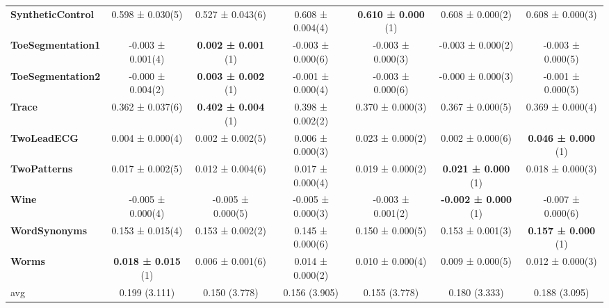\begin{table}[ht]
\begin{adjustbox}{width=\textwidth}
\begin{tabular}{lcccccc}
\textbf{SyntheticControl} & 0.598 ± 0.030(5) & 0.527 ± 0.043(6) & 0.608 ± 0.004(4) & \textbf{0.610 ± 0.000} (1) & 0.608 ± 0.000(2) & 0.608 ± 0.000(3) \\
\textbf{ToeSegmentation1} & -0.003 ± 0.001(4) & \textbf{0.002 ± 0.001} (1) & -0.003 ± 0.000(6) & -0.003 ± 0.000(3) & -0.003 ± 0.000(2) & -0.003 ± 0.000(5) \\
\textbf{ToeSegmentation2} & -0.000 ± 0.004(2) & \textbf{0.003 ± 0.002} (1) & -0.001 ± 0.000(4) & -0.003 ± 0.000(6) & -0.000 ± 0.000(3) & -0.001 ± 0.000(5) \\
\textbf{Trace} & 0.362 ± 0.037(6) & \textbf{0.402 ± 0.004} (1) & 0.398 ± 0.002(2) & 0.370 ± 0.000(3) & 0.367 ± 0.000(5) & 0.369 ± 0.000(4) \\
\textbf{TwoLeadECG} & 0.004 ± 0.000(4) & 0.002 ± 0.002(5) & 0.006 ± 0.000(3) & 0.023 ± 0.000(2) & 0.002 ± 0.000(6) & \textbf{0.046 ± 0.000} (1) \\
\textbf{TwoPatterns} & 0.017 ± 0.002(5) & 0.012 ± 0.004(6) & 0.017 ± 0.000(4) & 0.019 ± 0.000(2) & \textbf{0.021 ± 0.000} (1) & 0.018 ± 0.000(3) \\
\textbf{Wine} & -0.005 ± 0.000(4) & -0.005 ± 0.000(5) & -0.005 ± 0.000(3) & -0.003 ± 0.001(2) & \textbf{-0.002 ± 0.000} (1) & -0.007 ± 0.000(6) \\
\textbf{WordSynonyms} & 0.153 ± 0.015(4) & 0.153 ± 0.002(2) & 0.145 ± 0.000(6) & 0.150 ± 0.000(5) & 0.153 ± 0.001(3) & \textbf{0.157 ± 0.000} (1) \\
\textbf{Worms} & \textbf{0.018 ± 0.015} (1) & 0.006 ± 0.001(6) & 0.014 ± 0.000(2) & 0.010 ± 0.000(4) & 0.009 ± 0.000(5) & 0.012 ± 0.000(3) \\
\hline 
avg & 0.199 (3.111) & 0.150 (3.778) & 0.156 (3.905) & 0.155 (3.778) & 0.180 (3.333) & 0.188 (3.095) \\ 
\hline
\end{tabular}
\end{adjustbox}
\end{table}


